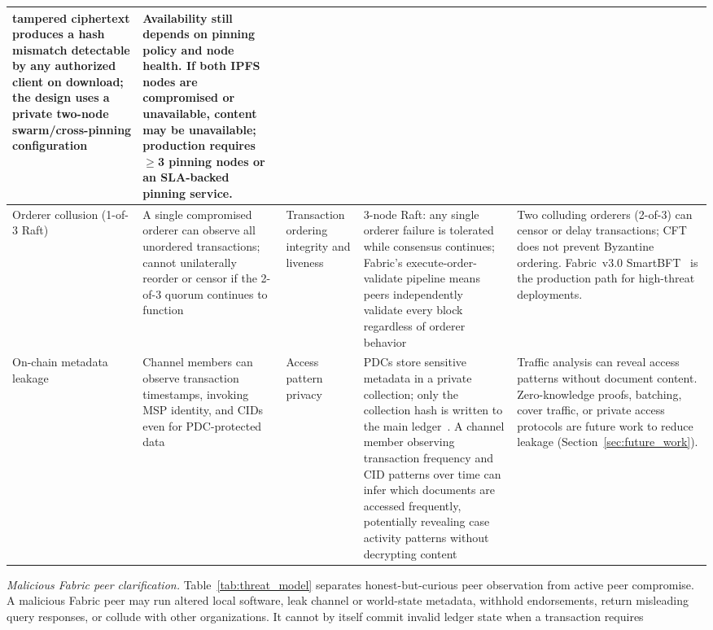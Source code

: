 \documentclass{ieeeaccess}
\begin{document}
\begin{table}[!t]
\begin{tabularx}{\textwidth}{|p{2.2cm}|X|p{2.0cm}|X|X|}
tampered ciphertext produces a hash mismatch detectable by any
authorized client on download; the design uses a private two-node
swarm/cross-pinning configuration &
Availability still depends on pinning policy and node health. If both
IPFS nodes are compromised or unavailable, content may be unavailable;
production requires $\geq$3 pinning nodes or an SLA-backed pinning
service. \\
\hline
Orderer collusion (1-of-3 Raft) &
A single compromised orderer can observe all unordered transactions;
cannot unilaterally reorder or censor if the 2-of-3 quorum continues
to function &
Transaction ordering integrity and liveness &
3-node Raft: any single orderer failure is tolerated while consensus
continues; Fabric's execute-order-validate pipeline means peers
independently validate every block regardless of orderer
behavior~\cite{androulaki2018hyperledger,
hyperledgerFabricOrderingService_v24} &
Two colluding orderers (2-of-3) can censor or delay transactions; CFT
does not prevent Byzantine ordering. Fabric~v3.0
SmartBFT~\cite{fabricWhatsNew3x,fabricOrderingServiceLatest} is the
production path for high-threat deployments. \\
\hline
On-chain metadata leakage &
Channel members can observe transaction timestamps, invoking MSP
identity, and CIDs even for PDC-protected data &
Access pattern privacy &
PDCs store sensitive metadata in a private collection; only the
collection hash is written to the main ledger~\cite{fabricPDCDoc}.
A channel member observing transaction frequency and CID patterns
over time can infer which documents are accessed frequently,
potentially revealing case activity patterns without decrypting
content &
Traffic analysis can reveal access patterns without document content.
Zero-knowledge proofs, batching, cover traffic, or private access
protocols are future work to reduce leakage
(Section~\ref{sec:future_work}). \\
\hline
\end{tabularx}
\par\vspace{3pt}
\begin{minipage}{\textwidth}
\raggedright\scriptsize
\smallskip
\noindent\textit{Malicious Fabric peer clarification.}
Table~\ref{tab:threat_model} separates honest-but-curious peer observation
from active peer compromise. A malicious Fabric peer may run altered local
software, leak channel or world-state metadata, withhold endorsements, return
misleading query responses, or collude with other organizations. It cannot by
itself commit invalid ledger state when a transaction requires

\end{minipage}
\end{table}
\end{document}
